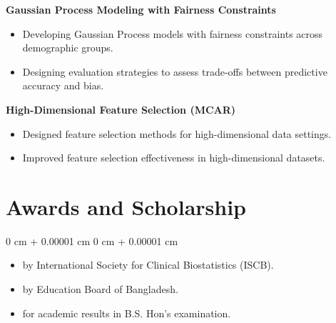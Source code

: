 \documentclass[10pt, letterpaper]{article}
\newenvironment{highlights}{
    \begin{itemize}[
        topsep=0.10 cm,
        parsep=0.10 cm,
        partopsep=0pt,
        itemsep=0pt,
        leftmargin=0 cm + 10pt
    ]
}{
    \end{itemize}
} %
\newenvironment{onecolentry}{
    \begin{adjustwidth}{
        0 cm + 0.00001 cm
    }{
        0 cm + 0.00001 cm
    }
}{
    \end{adjustwidth}
} %
\begin{document}
    \textbf{Gaussian Process Modeling with Fairness Constraints} \\
    \begin{itemize}
    \item Developing Gaussian Process models with fairness constraints across demographic groups.
    \item Designing evaluation strategies to assess trade-offs between predictive accuracy and bias.
    \end{itemize}

    \textbf{High-Dimensional Feature Selection (MCAR)} \\
    \begin{itemize}
    \item Designed feature selection methods for high-dimensional data settings.
    \item Improved feature selection effectiveness in high-dimensional datasets.
\end{itemize}

     \vspace{0.2 cm}
    \section{Awards and Scholarship}
        \vspace{0.10 cm}
        \begin{onecolentry}
            \begin{highlights}
                \item {} by International Society for Clinical Biostatistics (ISCB). %
                \item {} by Education Board of Bangladesh. %
                \item {} for academic results in B.S. Hon’s examination.
            \end{highlights}
        \end{onecolentry}

\end{document}
